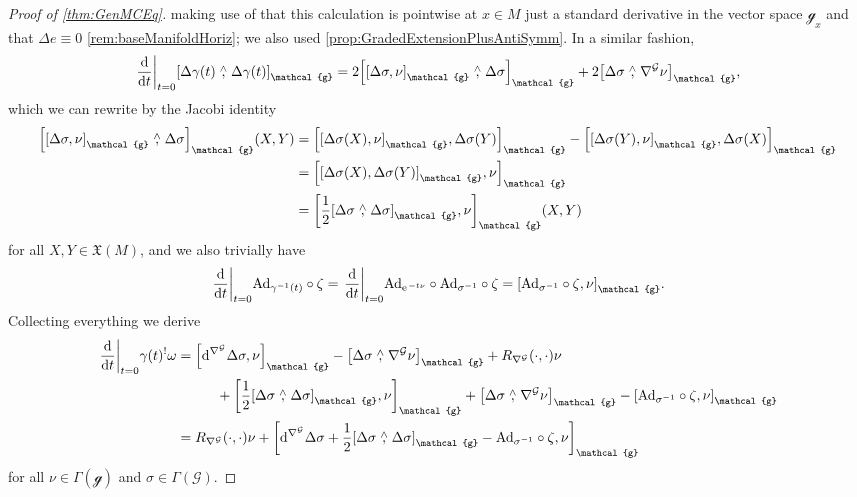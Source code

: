 \documentclass[reqno,a4paper,oneside]{amsart}
\newcommand{\e}{\ensuremath{\mathrm{e\;\!}}}
\theoremstyle{plain}
\theoremstyle{remark}
\theoremstyle{definition}
\begin{document}
\begin{proof}[Proof of \ref{thm:GenMCEq}]
making use of that this calculation is pointwise at $x \in M$ just a standard derivative in the vector space $\mathcal{g}_x$ and that $\Delta e \equiv 0$ \ref{rem:baseManifoldHoriz}; we also used \ref{prop:GradedExtensionPlusAntiSymm}. In a similar fashion,
\begin{equation*}
\mleft.\frac{\mathrm{d}}{\mathrm{d}t}\mright|_{t=0}\mleft[ \Delta\gamma(t) \stackrel{\wedge}{,} \Delta\gamma(t) \mright]_{\mathcal{g}}
=
2\mleft[ \mleft[\Delta\sigma, \nu \mright]_{\mathcal{g}} \stackrel{\wedge}{,} \Delta\sigma \mright]_{\mathcal{g}}
	+ 2\mleft[ \Delta \sigma \stackrel{\wedge}{,} \nabla^{\mathcal{G}}\nu \mright]_{\mathcal{g}},
\end{equation*}
which we can rewrite by the Jacobi identity
\begin{align*}
\mleft[ \mleft[\Delta\sigma, \nu \mright]_{\mathcal{g}} \stackrel{\wedge}{,} \Delta\sigma \mright]_{\mathcal{g}}(X, Y)
&=
\mleft[ \mleft[\Delta\sigma(X), \nu \mright]_{\mathcal{g}} , \Delta\sigma(Y) \mright]_{\mathcal{g}}
	- \mleft[ \mleft[\Delta\sigma(Y), \nu \mright]_{\mathcal{g}} , \Delta\sigma(X) \mright]_{\mathcal{g}}
\\
&=
\mleft[ \mleft[\Delta\sigma(X), \Delta\sigma(Y) \mright]_{\mathcal{g}} , \nu \mright]_{\mathcal{g}}
\\
&=
\mleft[ \frac{1}{2} \mleft[\Delta\sigma \stackrel{\wedge}{,} \Delta\sigma \mright]_{\mathcal{g}} , \nu \mright]_{\mathcal{g}}(X, Y)
\end{align*}
for all $X, Y \in \mathfrak{X}(M)$, and we also trivially have
\begin{equation*}
\mleft.\frac{\mathrm{d}}{\mathrm{d}t}\mright|_{t=0} \mathrm{Ad}_{\gamma^{-1}(t)} \circ \zeta
=
\mleft.\frac{\mathrm{d}}{\mathrm{d}t}\mright|_{t=0} \mathrm{Ad}_{\e^{-t\nu}} \circ \mathrm{Ad}_{\sigma^{-1}} \circ \zeta
=
\mleft[ \mathrm{Ad}_{\sigma^{-1}} \circ \zeta, \nu \mright]_{\mathcal{g}}.
\end{equation*}
Collecting everything we derive
\begin{align}\label{PullbackofMCEqGivesCurv}
\mleft.\frac{\mathrm{d}}{\mathrm{d}t}\mright|_{t=0} \gamma(t)^!\omega
&=
\mleft[ \mathrm{d}^{\nabla^{\mathcal{G}}} \Delta \sigma, \nu \mright]_{\mathcal{g}}
	- \mleft[\Delta \sigma \stackrel{\wedge}{,} \nabla^{\mathcal{G}}\nu \mright]_{\mathcal{g}}
	+ R_{\nabla^{\mathcal{G}}} (\cdot, \cdot) \nu
\nonumber
\\
&\hspace{1cm}
	+ \mleft[ \frac{1}{2} \mleft[\Delta\sigma \stackrel{\wedge}{,} \Delta\sigma \mright]_{\mathcal{g}} , \nu \mright]_{\mathcal{g}}
	+ \mleft[ \Delta \sigma \stackrel{\wedge}{,} \nabla^{\mathcal{G}}\nu \mright]_{\mathcal{g}}
	- \mleft[ \mathrm{Ad}_{\sigma^{-1}} \circ \zeta, \nu \mright]_{\mathcal{g}}
\nonumber
\\
&=
R_{\nabla^{\mathcal{G}}} (\cdot, \cdot) \nu
	+ \mleft[ 
		\mathrm{d}^{\nabla^{\mathcal{G}}} \Delta \sigma
		+ \frac{1}{2} \mleft[\Delta\sigma \stackrel{\wedge}{,} \Delta\sigma \mright]_{\mathcal{g}}
		- \mathrm{Ad}_{\sigma^{-1}} \circ \zeta
		, \nu \mright]_{\mathcal{g}}
\end{align}
for all $\nu \in \Gamma(\mathcal{g})$ and $\sigma \in \Gamma(\mathcal{G})$.


\end{proof}
\end{document}
